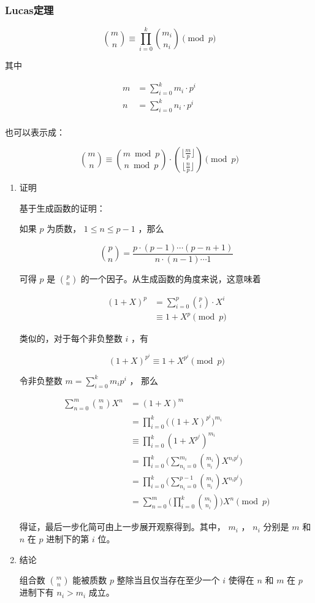 \documentclass[11pt]{article}
\begin{document}
\subsubsection{Lucas定理}
\label{sec-3-1-3}

$$
{\binom {m}{n}}\equiv \prod _{i=0}^{k}{\binom {m_{i}}{n_{i}}}{\pmod {p}}
$$

其中

$$\begin{aligned}
m&=\sum_{i=0}^k m_i \cdot p^i\\
n&=\sum_{i=0}^k n_i \cdot p^i\\
\end{aligned}$$

也可以表示成：

$$
\binom{m}{n} \equiv \binom{m \bmod p}{n \bmod p} \cdot \binom{\lfloor\frac{m}{p} \rfloor}{\lfloor \frac{n}{p} \rfloor} \pmod p
$$


\begin{enumerate}
\item 证明
\label{sec-3-1-3-1}

基于生成函数的证明：

如果 $p$ 为质数， $1\leq n \leq p-1$ ，那么

$$
\binom{p}{n} = \frac{p \cdot (p - 1) \cdots (p - n + 1)}{n \cdot (n - 1) \cdots 1}
$$

可得 $p$  是 $\binom{p}{n}$ 的一个因子。从生成函数的角度来说，这意味着

$$\begin{aligned}
(1 + X)^p &= \sum_{i=0}^p \binom{p}{i}\cdot X^i\\
&\equiv 1+X^p \pmod p
\end{aligned}$$

类似的，对于每个非负整数 $i$ ，有

$$
(1+X)^{p^i} \equiv 1 + X^{p^i} \pmod p
$$

令非负整数 $m=\sum_{i=0}^k m_i p^i$ ， 那么

$$\begin{aligned}
\sum_{n=0}^m \binom{m}{n}X^n &= (1 + X)^m \\
&=\prod_ {i=0}^k \Big ((1+X)^{p^i} \Big) ^{m_i}\\
&\equiv \prod_{i=0}^k(1+X^{p^i})^{m_i}\\
&=\prod_{i=0}^k\bigg ( \sum_{n_i=0}^{m_i} \binom{m_i}{n_i}X^{n_i p^i} \bigg)\\
&=\prod_{i=0}^k \bigg (\sum_{n_i=0}^{p-1} \binom{m_i}{n_i}X^{n_ip^i} \bigg)\\
&=\sum_{n=0}^m \bigg(\prod_{i=0}^k \binom{m_i}{n_i} \bigg) X^n \pmod p
\end{aligned}$$

得证，最后一步化简可由上一步展开观察得到。其中， $m_i$ ， $n_i$ 分别是 $m$ 和 $n$ 在 $p$ 进制下的第 $i$ 位。

\item 结论
\label{sec-3-1-3-2}

组合数 $\binom{m}{n}$ 能被质数 $p$ 整除当且仅当存在至少一个 $i$ 使得在 $n$ 和 $m$ 在 $p$ 进制下有 $n_i > m_i$ 成立。
\end{enumerate}
\end{document}

